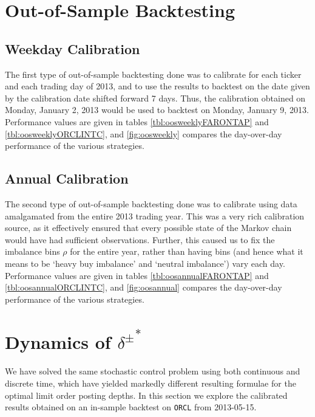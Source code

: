 \section{Out-of-Sample Backtesting}
\subsection{Weekday Calibration}
The first type of out-of-sample backtesting done was to calibrate for each ticker and each trading day of 2013, and to use the results to backtest on the date given by the calibration date shifted forward 7 days. Thus, the calibration obtained on Monday, January 2, 2013 would be used to backtest on Monday, January 9, 2013. Performance values are given in tables \autoref{tbl:oosweeklyFARONTAP} and \autoref{tbl:oosweeklyORCLINTC}, and \autoref{fig:oosweekly} compares the day-over-day performance of the various strategies. 



\subsection{Annual Calibration}
The second type of out-of-sample backtesting done was to calibrate using data amalgamated from the entire 2013 trading year. This was a very rich calibration source, as it effectively ensured that every possible state of the Markov chain would have had sufficient observations. Further, this caused us to fix the imbalance bins $\rho$ for the entire year, rather than having bins (and hence what it means to be `heavy buy imbalance' and `neutral imbalance') vary each day. Performance values are given in tables \autoref{tbl:oosannualFARONTAP} and \autoref{tbl:oosannualORCLINTC}, and \autoref{fig:oosannual} compares the day-over-day performance of the various strategies. 


\section{Dynamics of \texorpdfstring{${\delta^{\pm}}^*$}{delta}}

We have solved the same stochastic control problem using both continuous and discrete time, which have yielded markedly different resulting formulae for the optimal limit order posting depths. In this section we explore the calibrated results obtained on an in-sample backtest on \texttt{ORCL} from 2013-05-15.


